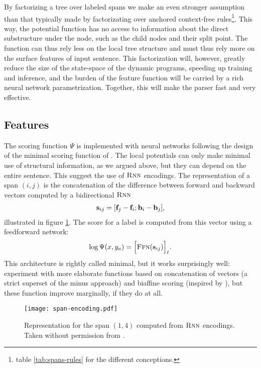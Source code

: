 By factorizing a tree over labeled spans we make an even stronger assumption than that typically made by factorizating over anchored context-free rules\footnote{\cf table \ref{tab:spans-rules} for the different conceptions.}. This way, the potential function has no access to information about the direct substructure under the node, such as the child nodes and their split point. The function can thus rely less on the local tree structure and must thus rely more on the surface features of input sentence. This factorization will, however, greatly reduce the size of the state-space of the dynamic programs, speeding up training and inference, and the burden of the feature function will be carried by a rich neural network parametrization. Together, this will make the parser fast and very effective.

\subsection{Features}
The scoring function $\Psi$ is implemented with neural networks following the design of the minimal scoring function of \citet{stern2017minimal}. The local potentials can only make minimal use of structural information, as we argued above, but they can depend on the entire sentence. This suggest the use of $\textsc{Rnn}$ encodings. The representation of a span $(i, j)$ is the concatenation of the difference between forward and backward vectors computed by a bidirectional $\textsc{Rnn}$
\begin{align}
  \label{eq:potential-function}
  \mathbf{s}_{ij} = [\mathbf{f}_j - \mathbf{f}_i; \mathbf{b}_i - \mathbf{b}_j],
\end{align}
illustrated in figure \ref{fig:span-feature}. The score for a label is computed from this vector using a feedforward network:
\begin{align}
  \log \Psi(x, y_a) = \Big[ \textsc{Ffn}( \mathbf{s}_{ij} ) \Big]_{\ell}.
\end{align}
This architecture is rightly called minimal, but it works surprisingly well: \citet{stern2017minimal} experiment with more elaborate functions based on concatenation of vectors (a strict superset of the minus approach) and biaffine scoring (inspired by \citep{dozat2016deep}), but these function improve marginally, if they do at all.

\begin{figure}
  \texttt{[image: span-encoding.pdf]}
  \caption{Representation for the span $(1, 4)$ computed from $\textsc{Rnn}$ encodings. Taken without permission from \citet{stern2018analyis}.}
  \label{fig:span-feature}
\end{figure}

